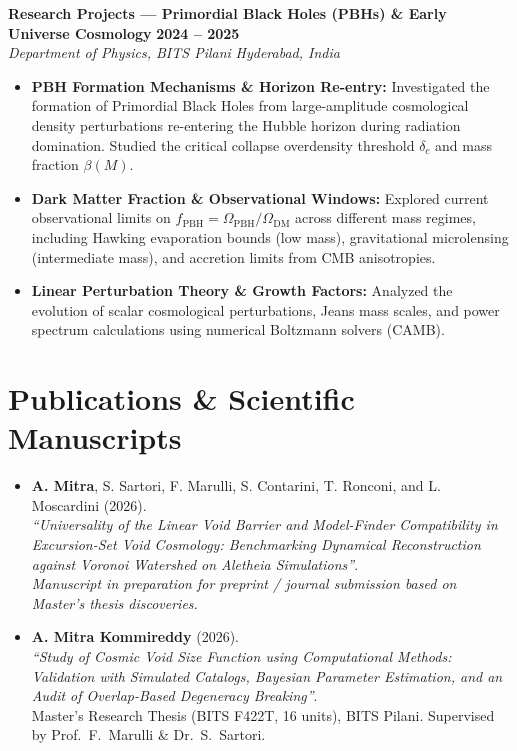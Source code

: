 \documentclass[10pt,a4paper]{article}
\newcommand{\entryheader}[4]{%
    \noindent\textbf{#1} \hfill {\color{secondaryslate}\footnotesize\textbf{#2}}\\%
    \noindent\textit{#3} \hfill {\color{secondaryslate}\footnotesize\textit{#4}}\vspace{1.5pt}%
}
\begin{document}
\vspace{3pt}

\entryheader{Research Projects --- Primordial Black Holes (PBHs) \& Early Universe Cosmology}{2024 -- 2025}{Department of Physics, BITS Pilani}{Hyderabad, India}
\begin{itemize}
    \item \textbf{PBH Formation Mechanisms \& Horizon Re-entry:} Investigated the formation of Primordial Black Holes from large-amplitude cosmological density perturbations re-entering the Hubble horizon during radiation domination. Studied the critical collapse overdensity threshold $\delta_c$ and mass fraction $\beta(M)$.
    \item \textbf{Dark Matter Fraction \& Observational Windows:} Explored current observational limits on $f_{\mathrm{PBH}} = \Omega_{\mathrm{PBH}}/\Omega_{\mathrm{DM}}$ across different mass regimes, including Hawking evaporation bounds (low mass), gravitational microlensing (intermediate mass), and accretion limits from CMB anisotropies.
    \item \textbf{Linear Perturbation Theory \& Growth Factors:} Analyzed the evolution of scalar cosmological perturbations, Jeans mass scales, and power spectrum calculations using numerical Boltzmann solvers (CAMB).
\end{itemize}

\section{Publications \& Scientific Manuscripts}

\begin{itemize}
    \item \textbf{A. Mitra}, S. Sartori, F. Marulli, S. Contarini, T. Ronconi, and L. Moscardini (2026).\\
    \textit{``Universality of the Linear Void Barrier and Model-Finder Compatibility in Excursion-Set Void Cosmology: Benchmarking Dynamical Reconstruction against Voronoi Watershed on Aletheia Simulations''}.\\
    \textit{Manuscript in preparation for preprint / journal submission based on Master's thesis discoveries.}
    \item \textbf{A. Mitra Kommireddy} (2026).\\
    \textit{``Study of Cosmic Void Size Function using Computational Methods: Validation with Simulated Catalogs, Bayesian Parameter Estimation, and an Audit of Overlap-Based Degeneracy Breaking''}.\\
    Master's Research Thesis (BITS F422T, 16 units), BITS Pilani. Supervised by Prof.\ F.~Marulli \& Dr.\ S.~Sartori.
\end{itemize}
\end{document}

